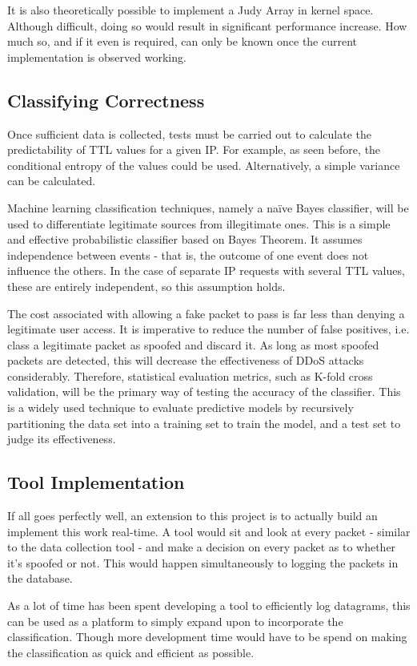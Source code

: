 \documentclass[twocolumn,10pt]{asme2ej}
\begin{document}
It is also theoretically possible to implement a Judy Array in kernel space. Although difficult, doing so would result in significant performance increase. How much so, and if it even is required, can only be known once the current implementation is observed working.

\subsection{Classifying Correctness}
Once sufficient data is collected, tests must be carried out to calculate the predictability of TTL values for a given IP. For example, as seen before, the conditional entropy of the values could be used. Alternatively, a simple variance can be calculated.

Machine learning classification techniques, namely a naïve Bayes classifier\cite{naive}, will be used to differentiate legitimate sources from illegitimate ones. This is a simple and effective probabilistic classifier based on Bayes Theorem. It assumes independence between events - that is, the outcome of one event does not influence the others. In the case of separate IP requests with several TTL values, these are entirely independent, so this assumption holds.

The cost associated with allowing a fake packet to pass is far less than denying a legitimate user access. It is imperative to reduce the number of false positives, i.e. class a legitimate packet as spoofed and discard it. As long as most spoofed packets are detected, this will decrease the effectiveness of DDoS attacks considerably. Therefore, statistical evaluation metrics, such as K-fold cross validation\cite{kfold}, will be the primary way of testing the accuracy of the classifier. This is a widely used technique to evaluate predictive models by recursively partitioning the data set into a training set to train the model, and a test set to judge its effectiveness. 

\subsection{Tool Implementation}
If all goes perfectly well, an extension to this project is to actually build an implement this work real-time. A tool would sit and look at every packet - similar to the data collection tool - and make a decision on every packet as to whether it's spoofed or not. This would happen simultaneously to logging the packets in the database.

As a lot of time has been spent developing a tool to efficiently log datagrams, this can be used as a platform to simply expand upon to incorporate the classification. Though more development time would have to be spend on making the classification as quick and efficient as possible.






\end{document}
